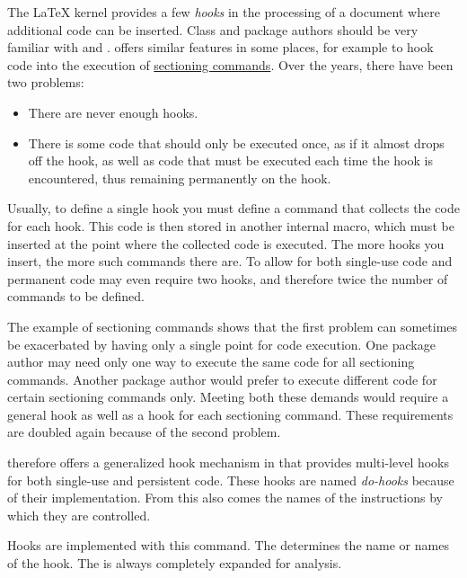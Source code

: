 \BeginIndexGroup
{}
The \LaTeX{} kernel provides a few \emph{hooks} in the processing of
a document where additional code can be inserted. Class and package authors
should be very familiar with  and
. \KOMAScript{} offers similar features in some places,
for example to hook code into the execution of 
\hyperref[sec:maincls.structure]{sectioning commands}. Over the years, there
have been two problems:
\begin{itemize}
  \item There are never enough hooks.
  \item There is some code that should only be executed once, as if it almost
  drops off the hook, as well as code that must be executed each time the
  hook is encountered, thus remaining permanently on the hook.
\end{itemize}
Usually, to define a single hook you must define a command that collects the
code for each hook. This code is then stored in another internal macro, which
must be inserted at the point where the collected code is executed. The more
hooks you insert, the more such commands there are. To allow for both
single-use code and permanent code may even require two hooks, and therefore
twice the number of commands to be defined.

The example of sectioning commands shows that the first problem can sometimes
be exacerbated by having only a single point for code execution. One package
author may need only one way to execute the same code for all sectioning
commands. Another package author would prefer to execute different code for
certain sectioning commands only. Meeting both these demands would require a
general hook as well as a hook for each sectioning command. These requirements
are doubled again because of the second problem.

\KOMAScript{} therefore offers a generalized hook mechanism in
 that provides multi-level hooks for both single-use and
persistent code. These hooks are named \emph{do-hooks} because of their
implementation. From this also comes the names of the instructions by which
they are controlled.

\begin{Declaration}
\end{Declaration}
Hooks are implemented with this
command. The  determines the name or names of the hook. The
 is always completely expanded for analysis.


